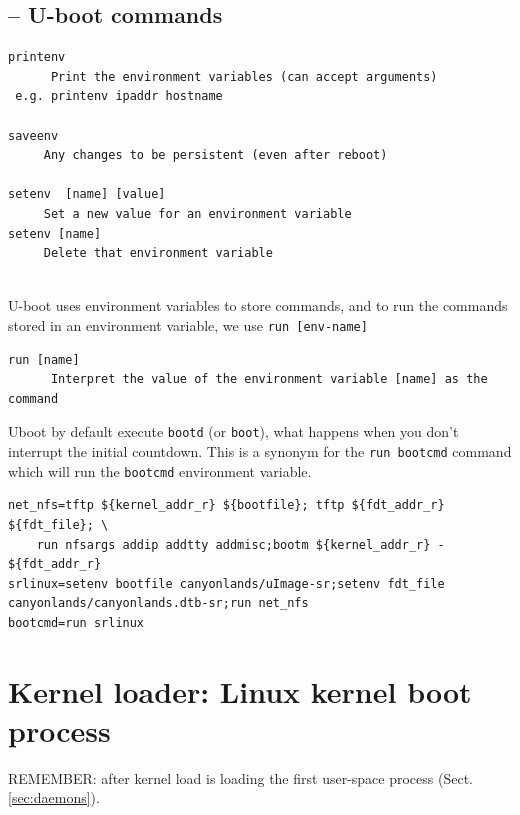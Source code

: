 \subsection{-- U-boot commands}
\label{sec:Uboot-commands}

\begin{verbatim}
printenv
      Print the environment variables (can accept arguments)
 e.g. printenv ipaddr hostname      
      
saveenv
     Any changes to be persistent (even after reboot)
     
setenv  [name] [value]
     Set a new value for an environment variable
setenv [name]
     Delete that environment variable
     
\end{verbatim}

U-boot uses environment variables to store commands, and to run the commands
stored in an environment variable, we use \verb!run [env-name]!
\begin{verbatim}
run [name]
      Interpret the value of the environment variable [name] as the command
\end{verbatim}

Uboot by default execute \verb!bootd! (or \verb!boot!),
what happens when you don't interrupt the initial countdown. This is a synonym
for the \verb!run bootcmd! command which will run the
\verb!bootcmd! environment variable.
\begin{verbatim}
net_nfs=tftp ${kernel_addr_r} ${bootfile}; tftp ${fdt_addr_r} ${fdt_file}; \
    run nfsargs addip addtty addmisc;bootm ${kernel_addr_r} - ${fdt_addr_r}
srlinux=setenv bootfile canyonlands/uImage-sr;setenv fdt_file canyonlands/canyonlands.dtb-sr;run net_nfs
bootcmd=run srlinux
\end{verbatim}




  
\section{Kernel loader: Linux kernel boot process}
\label{sec:boot-process-Linux-kernel}
\label{sec:kernel-loader}

REMEMBER: after kernel load is loading the first user-space process
(Sect.\ref{sec:daemons}).

